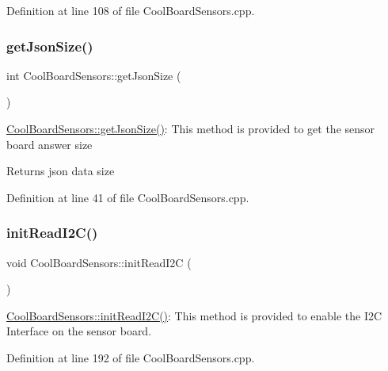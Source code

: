 Definition at line 108 of file Cool\+Board\+Sensors.\+cpp.

\mbox{\label{class_cool_board_sensors_ab82c2a1633768ccd12a589320fa31a14}} 
\subsubsection{\texorpdfstring{get\+Json\+Size()}{getJsonSize()}}
{\footnotesize\ttfamily int Cool\+Board\+Sensors\+::get\+Json\+Size (\begin{DoxyParamCaption}{ }\end{DoxyParamCaption})}

\hyperlink{class_cool_board_sensors_ab82c2a1633768ccd12a589320fa31a14}{Cool\+Board\+Sensors\+::get\+Json\+Size()}\+: This method is provided to get the sensor board answer size

\begin{DoxyReturn}{Returns}
json data size 
\end{DoxyReturn}


Definition at line 41 of file Cool\+Board\+Sensors.\+cpp.

\mbox{\label{class_cool_board_sensors_acad6a8418c66d36868caca23c844ecb6}} 
\subsubsection{\texorpdfstring{init\+Read\+I2\+C()}{initReadI2C()}}
{\footnotesize\ttfamily void Cool\+Board\+Sensors\+::init\+Read\+I2C (\begin{DoxyParamCaption}{ }\end{DoxyParamCaption})}

\hyperlink{class_cool_board_sensors_acad6a8418c66d36868caca23c844ecb6}{Cool\+Board\+Sensors\+::init\+Read\+I2\+C()}\+: This method is provided to enable the I2C Interface on the sensor board. 

Definition at line 192 of file Cool\+Board\+Sensors.\+cpp.

